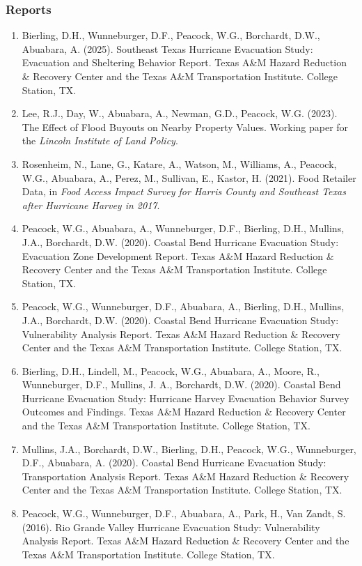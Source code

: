 \documentclass[11pt,oneside]{article}
\begin{document}
\subsubsection{Reports}
\begin{enumerate}[leftmargin=40pt]
\item Bierling, D.H., Wunneburger, D.F., Peacock, W.G., Borchardt, D.W., Abuabara, A. (2025). {Southeast Texas Hurricane Evacuation Study: Evacuation and Sheltering Behavior Report}. Texas A\&M Hazard Reduction \& Recovery Center and the Texas A\&M Transportation Institute. College Station, TX.
\item Lee, R.J., Day, W., Abuabara, A., Newman, G.D., Peacock, W.G. (2023). The Effect of Flood Buyouts on Nearby Property Values. Working paper for the \emph{Lincoln Institute of Land Policy}.
\item Rosenheim, N., Lane, G., Katare, A., Watson, M., Williams, A., Peacock, W.G., Abuabara, A., Perez, M., Sullivan, E., Kastor, H. (2021). Food Retailer Data, in \emph{Food Access Impact Survey for Harris County and Southeast Texas after Hurricane Harvey in 2017}.
\item Peacock, W.G., Abuabara, A., Wunneburger, D.F., Bierling, D.H., Mullins, J.A., Borchardt, D.W. (2020). Coastal Bend Hurricane Evacuation Study: Evacuation Zone Development Report. Texas A\&M Hazard Reduction \& Recovery Center and the Texas A\&M Transportation Institute. College Station, TX.
\item Peacock, W.G., Wunneburger, D.F., Abuabara, A., Bierling, D.H., Mullins, J.A., Borchardt, D.W. (2020). Coastal Bend Hurricane Evacuation Study: Vulnerability Analysis Report. Texas A\&M Hazard Reduction \& Recovery Center and the Texas A\&M Transportation Institute. College Station, TX.
\item Bierling, D.H., Lindell, M., Peacock, W.G., Abuabara, A., Moore, R., Wunneburger, D.F., Mullins, J. A., Borchardt, D.W. (2020). Coastal Bend Hurricane Evacuation Study: Hurricane Harvey Evacuation Behavior Survey Outcomes and Findings. Texas A\&M Hazard Reduction \& Recovery Center and the Texas A\&M Transportation Institute. College Station, TX.
\item Mullins, J.A., Borchardt, D.W., Bierling, D.H., Peacock, W.G., Wunneburger, D.F., Abuabara, A. (2020). Coastal Bend Hurricane Evacuation Study: Transportation Analysis Report. Texas A\&M Hazard Reduction \& Recovery Center and the Texas A\&M Transportation Institute. College Station, TX.
\item Peacock, W.G., Wunneburger, D.F., Abuabara, A., Park, H., Van Zandt, S. (2016). Rio Grande Valley Hurricane Evacuation Study: Vulnerability Analysis Report. Texas A\&M Hazard Reduction \& Recovery Center and the Texas A\&M Transportation Institute. College Station, TX.
\end{enumerate}
\end{document}
